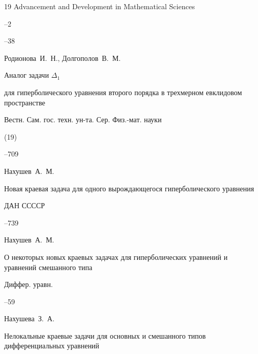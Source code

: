 \begin{thebibliography}{19}
\jour Advancement and Development in Mathematical Sciences



--2

--38




\by Родионова~И.~Н., Долгополов~В.~М.

\paper Аналог задачи $\Delta_1$

 для гиперболического уравнения второго порядка в трехмерном евклидовом пространстве

\jour Вестн. Сам. гос. техн. ун-та. Сер. Физ.-мат. науки


(19)

--709






\by Нахушев~А.~М.

\paper Новая краевая задача для одного вырождающегося гиперболического уравнения 

\jour ДАН ССССР




–739





\by Нахушев~А.~М.

\paper О некоторых новых краевых задачах для гиперболических уравнений и уравнений смешанного типа 

\jour Диффер. уравн.




–59





\by Нахушева~З.~А.

\book Нелокальные краевые задачи для основных и смешанного типов дифференциальных уравнений


\end{thebibliography}
